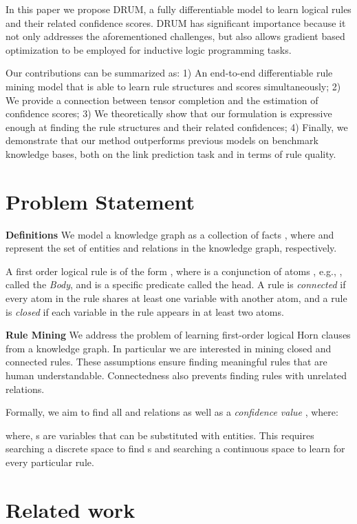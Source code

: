 \documentclass{article}
\begin{document}
In this paper we propose DRUM, a fully differentiable model to learn logical rules and their related confidence scores. DRUM has significant importance because it not only addresses the aforementioned challenges, but also allows gradient based optimization to be employed for inductive logic programming tasks.

Our contributions can be summarized as: 1) An end-to-end differentiable rule mining model that is able to learn rule structures and scores simultaneously; 2) We provide a connection between tensor completion and the estimation of confidence scores; 3) We theoretically show that our formulation is expressive enough at finding the rule structures and their related confidences; 
4) Finally, we demonstrate that our method outperforms previous models on benchmark knowledge bases, both on the link prediction task and in terms of rule quality.

\section{Problem Statement}
\label{sec:problem_statement}

\noindent \textbf{Definitions} \quad We model a knowledge graph as a collection of facts , where  and  represent the set of entities and relations in the knowledge graph, respectively.

A first order logical rule is of the form , where  is a conjunction of atoms , e.g., , called the \textit{Body}, and  is a specific predicate called the head. A rule is  \textit{connected} if every atom in the rule shares at least one variable with another atom, and a rule is \textit{closed} if each variable in the rule appears in at least two atoms.

\textbf{Rule Mining} \quad We address the problem of learning first-order logical Horn clauses from a knowledge graph. In particular we are interested in mining closed and connected rules. These assumptions ensure finding meaningful rules that are human understandable. Connectedness also prevents finding rules with unrelated relations.

Formally, we aim to find all  and relations  as well as a \textit{confidence value} , where:




where, s are variables that can be substituted with entities. This requires searching a discrete space to find s and searching a continuous space to learn  for every particular rule. 

\section{Related work}
\label{sec:related_work}
\end{document}
